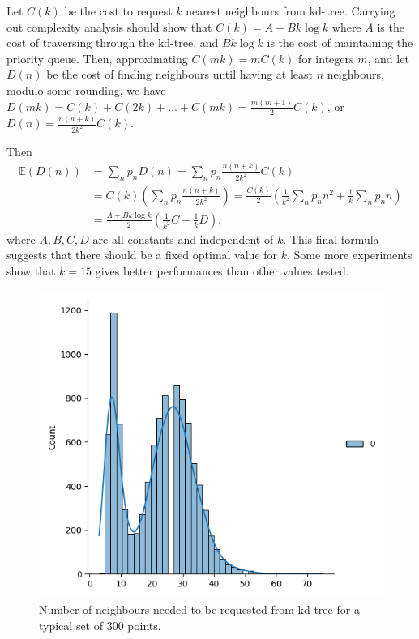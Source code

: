 \documentclass{amsart}
\begin{document}
Let $C(k)$ be the cost to request $k$ nearest neighbours from kd-tree. Carrying out complexity analysis should show that $C(k) = A + Bk\log k$ where $A$ is the cost of traversing through the kd-tree, and $Bk\log k$ is the cost of maintaining the priority queue. Then, approximating $C(mk) = mC(k)$ for integers $m$, and let $D(n)$ be the cost of finding neighbours until having at least $n$ neighbours, modulo some rounding, we have $D(mk) = C(k) + C(2k) + ... + C(mk) = \frac{m(m+1)}{2}C(k)$, or $D(n) = \frac{n(n+k)}{2k^2} C(k)$.

Then 
\begin{align*}
    \mathbb{E}(D(n)) 
    & = \sum_n p_n D(n) = \sum_n p_n \frac{n(n+k)}{2k^2} C(k) \\
    & = C(k) \left(\sum_n p_n \frac{n(n+k)}{2k^2}\right) = \frac{C(k)}{2} \left(\frac{1}{k^2} \sum_n p_n n^2 + \frac{1}{k} \sum_n p_n n \right) \\
    & = \frac{A + Bk\log k}{2} \left(\frac{1}{k^2} C + \frac{1}{k} D \right),
\end{align*}
where $A, B, C, D$ are all constants and independent of $k$. This final formula suggests that there should be a fixed optimal value for $k$. Some more experiments show that $k = 15$ gives better performances than other values tested.

\begin{figure}
    \centering
    \includegraphics[width=.75\textwidth]{img/plot.png}
    \caption{Number of neighbours needed to be requested from kd-tree for a typical set of 300 points.}
\end{figure}
\end{document}
